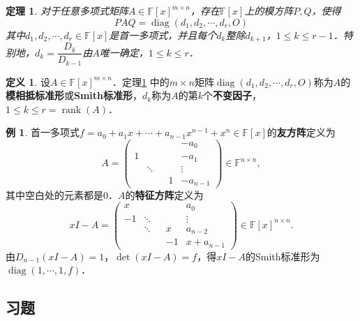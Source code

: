 \documentclass[a4paper,fontset=windows]{ctexbook}
\newtheorem{theorem}{定理}[chapter]
\theoremstyle{definition}
\newtheorem{definition}{定义}[chapter]
\newtheorem{example}{例}[chapter]
\DeclareMathOperator{\diag}{diag}
\DeclareMathOperator{\rank}{rank}
\renewcommand{\le}{\leqslant}
\begin{document}
\begin{theorem}\label{thm4.14}
对于任意多项式矩阵$A\in\mathbb{F}[x]^{m\times n}$，存在$\mathbb{F}[x]$上的模方阵$P,Q$，使得
$$PAQ=\diag(d_1,d_2,\cdots,d_r,O)$$
其中$d_1,d_2,\cdots,d_r\in\mathbb{F}[x]$是首一多项式，并且每个$d_k$整除$d_{k+1}$，$1\le k\le r-1$．特别地，$d_k=\dfrac{D_k}{D_{k-1}}$由$A$唯一确定，$1\le k\le r$．
\end{theorem}

\begin{definition}
设$A\in\mathbb{F}[x]^{m\times n}$．定理\ref{thm4.14} 中的$m\times n$矩阵$\diag(d_1,d_2,\cdots,d_r,O)$称为$A$的{\bf 模相抵标准形}或{\bf Smith}{\bf 标准形}，$d_k$称为$A$的第$k$个{\bf 不变因子}，$1\le k\le r=\rank(A)$．
\end{definition}

\begin{example}\label{ex4.15}
首一多项式$f=a_0+a_1x+\cdots+a_{n-1}x^{n-1}+x^n\in\mathbb{F}[x]$的{\bf 友方阵}定义为
$$A=\begin{pmatrix}&&&&-a_0 \\ 1&&&&-a_1 \\ &\ddots&&&\vdots \\ &&&1&-a_{n-1}\end{pmatrix}\in\mathbb{F}^{n\times n},$$
其中空白处的元素都是0．$A$的{\bf 特征方阵}定义为
$$xI-A=\begin{pmatrix}x&&&&a_0 \\ -1&\ddots&&&\vdots \\ &\ddots&&x&a_{n-2} \\ &&&-1&x+a_{n-1}\end{pmatrix}\in\mathbb{F}[x]^{n\times n}.$$
由$D_{n-1}(xI-A)=1$，$\det(xI-A)=f$，得$xI-A$的Smith标准形为$\diag(1,\cdots,1,f)$．
\end{example}

\subsection*{习题}
\end{document}
